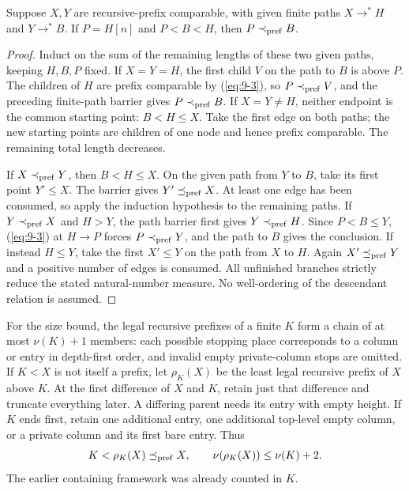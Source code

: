 \begin{lemma}\label{lem:two-paths}
Suppose $X,Y$ are recursive-prefix comparable, with given finite paths
$X\to^*H$ and $Y\to^*B$. If $P=H[n]$ and $P<B<H$, then
$P\prec_{\mathrm{pref}} B$.
\end{lemma}
\begin{proof}
Induct on the sum of the remaining lengths of these two given paths,
keeping $H,B,P$ fixed. If $X=Y=H$, the first child $V$ on the path
to $B$ is above $P$. The children of $H$ are prefix comparable by
(\ref{eq:9-3}), so $P\prec_{\mathrm{pref}} V$, and the preceding finite-path barrier gives
$P\prec_{\mathrm{pref}} B$. If $X=Y\ne H$, neither endpoint is the common starting
point: $B<H\le X$. Take the first edge on both paths; the new starting
points are children of one node and hence prefix comparable. The
remaining total length decreases.

If $X\prec_{\mathrm{pref}} Y$, then $B<H\le X$. On the given path from $Y$ to $B$,
take its first point $Y'\le X$. The barrier gives $Y'\preceq_{\mathrm{pref}} X$.
At least one edge has been consumed, so apply the induction hypothesis
to the remaining paths. If $Y\prec_{\mathrm{pref}} X$ and $H>Y$, the path barrier
first gives $Y\prec_{\mathrm{pref}} H$. Since $P<B\le Y$, (\ref{eq:9-3}) at $H\to P$
forces $P\prec_{\mathrm{pref}} Y$, and the path to $B$ gives the conclusion. If
instead $H\le Y$, take the first $X'\le Y$ on the path from $X$
to $H$. Again $X'\preceq_{\mathrm{pref}} Y$ and a positive number of edges is consumed.
All unfinished branches strictly reduce the stated natural-number
measure. No well-ordering of the descendant relation is assumed.
\end{proof}

For the size bound, the legal recursive prefixes of a finite $K$ form
a chain of at most $\nu(K)+1$ members: each possible stopping place
corresponds to a column or entry in depth-first order, and invalid empty
private-column stops are omitted. If $K<X$ is not itself a prefix,
let $\rho_K(X)$ be the least legal recursive prefix of $X$ above $K$.
At the first difference of $X$ and $K$, retain just that difference
and truncate everything later. A differing parent needs its entry
with empty height. If $K$ ends first, retain one additional entry,
one additional top-level empty column, or a private column and its
first bare entry. Thus
\begin{equation}\label{eq:9-4}
          K<\rho_K(X)\preceq_{\mathrm{pref}} X,\qquad
          \nu(\rho_K(X))\le\nu(K)+2.                       
\end{equation}
The earlier containing framework was already counted in $K$.

